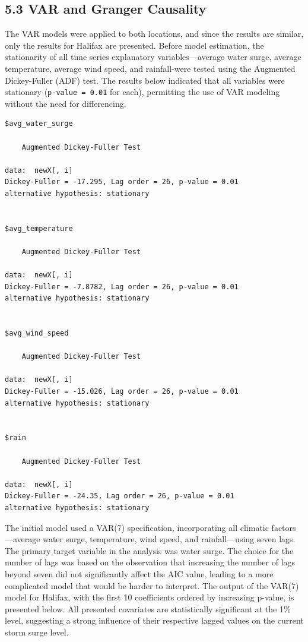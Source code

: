 \documentclass[
  letterpaper,
  DIV=11,
  numbers=noendperiod]{scrartcl}
\begin{document}
\subsection{5.3 VAR and Granger
Causality}\label{var-and-granger-causality}

The VAR models were applied to both locations, and since the results are
similar, only the results for Halifax are presented. Before model
estimation, the stationarity of all time series explanatory
variables---average water surge, average temperature, average wind
speed, and rainfall-were tested using the Augmented Dickey-Fuller (ADF)
test. The results below indicated that all variables were stationary
(\texttt{p-value\ =\ 0.01} for each), permitting the use of VAR modeling
without the need for differencing.

\begin{verbatim}
$avg_water_surge

    Augmented Dickey-Fuller Test

data:  newX[, i]
Dickey-Fuller = -17.295, Lag order = 26, p-value = 0.01
alternative hypothesis: stationary


$avg_temperature

    Augmented Dickey-Fuller Test

data:  newX[, i]
Dickey-Fuller = -7.8782, Lag order = 26, p-value = 0.01
alternative hypothesis: stationary


$avg_wind_speed

    Augmented Dickey-Fuller Test

data:  newX[, i]
Dickey-Fuller = -15.026, Lag order = 26, p-value = 0.01
alternative hypothesis: stationary


$rain

    Augmented Dickey-Fuller Test

data:  newX[, i]
Dickey-Fuller = -24.35, Lag order = 26, p-value = 0.01
alternative hypothesis: stationary
\end{verbatim}

The initial model used a VAR(7) specification, incorporating all
climatic factors---average water surge, temperature, wind speed, and
rainfall---using seven lags. The primary target variable in the analysis
was water surge. The choice for the number of lags was based on the
observation that increasing the number of lags beyond seven did not
significantly affect the AIC value, leading to a more complicated model
that would be harder to interpret. The output of the VAR(7) model for
Halifax, with the first 10 coefficients ordered by increasing p-value,
is presented below. All presented covariates are statistically
significant at the 1\% level, suggesting a strong influence of their
respective lagged values on the current storm surge level.
\end{document}
